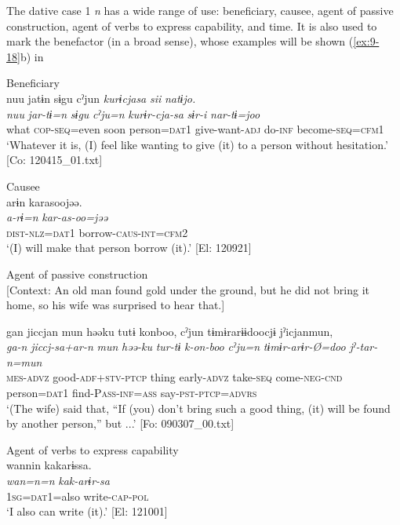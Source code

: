 The dative case 1 \textit{n} has a wide range of use: beneficiary, causee, agent of passive construction, agent of verbs to express capability, and time. It is also used to mark the benefactor (in a broad sense), whose examples will be shown (\ref{ex:9-18}b) in 

\ea\label{ex:6-55}
\ea Beneficiary\\
{\TM}
\glll  nuu  jatɨn  sɨgu  cˀjun  \textit{kurɨcjasa}  \textit{sii}  \textit{natɨjo.}\\
\textit{nuu}  \textit{jar-tɨ=n}  \textit{sɨgu}  \textit{cˀju=n}  \textit{kurɨr-cja-sa}      \textit{sɨr-i}  \textit{nar-tɨ=joo}\\
what  \textsc{cop}-\textsc{seq}=even  soon  person=\textsc{dat}1  give-want-\textsc{adj}   do-\textsc{inf}  become-\textsc{seq}=\textsc{cfm}1\\
\glt ‘Whatever it is, (I) feel like wanting to give (it) to a person without hesitation.’ [Co: 120415\_01.txt]
\z

\ex Causee\\
{\TM}
\glll  arɨn  karasoojəə.\\
\textit{a-rɨ=n}  \textit{kar-as-oo=jəə}\\
\textsc{dist}-\textsc{nlz}=\textsc{dat}1  borrow-\textsc{caus}-\textsc{int}=\textsc{cfm}2\\
\glt ‘(I) will make that person borrow (it).’ [El: 120921]

\ex Agent of passive construction\\{}
[Context: An old man found gold under the ground, but he did not bring it home, so his wife was surprised to hear that.]

{\TM}
\glll gan  jiccjan  mun  həəku  tutɨ   konboo,  cˀjun  tɨmɨrarɨɨdoocjɨ  jˀicjanmun,\\
      \textit{ga-n}  \textit{jiccj-sa+ar-n}  \textit{mun}  \textit{həə-ku}  \textit{tur-tɨ}  \textit{k-on-boo}  \textit{cˀju=n}  \textit{tɨmɨr-arɨr-Ø=doo}  \textit{jˀ-tar-n=mun}\\
      \textsc{mes}-\textsc{advz}  good-\textsc{adf}+\textsc{stv}-\textsc{ptcp}  thing  early-\textsc{advz}  take-\textsc{seq} come-\textsc{neg}-\textsc{cnd}  person=\textsc{dat}1  find-P\textsc{ass}-\textsc{inf}=\textsc{ass}  say-\textsc{pst}-\textsc{ptcp}=\textsc{advrs}\\
\glt ‘(The wife) said that, “If (you) don’t bring such a good thing, (it) will be found by another person,” but ...’ [Fo: 090307\_00.txt]
\z

\ex Agent of verbs to express capability\\
{\TM}
\glll  wannin  kakarɨssa.\\
\textit{wan=n=n}  \textit{kak-arɨr-sa}\\
1\textsc{sg}=\textsc{dat}1=also  write-\textsc{cap}-\textsc{pol}\\
\glt ‘I also can write (it).’ [El: 121001]

